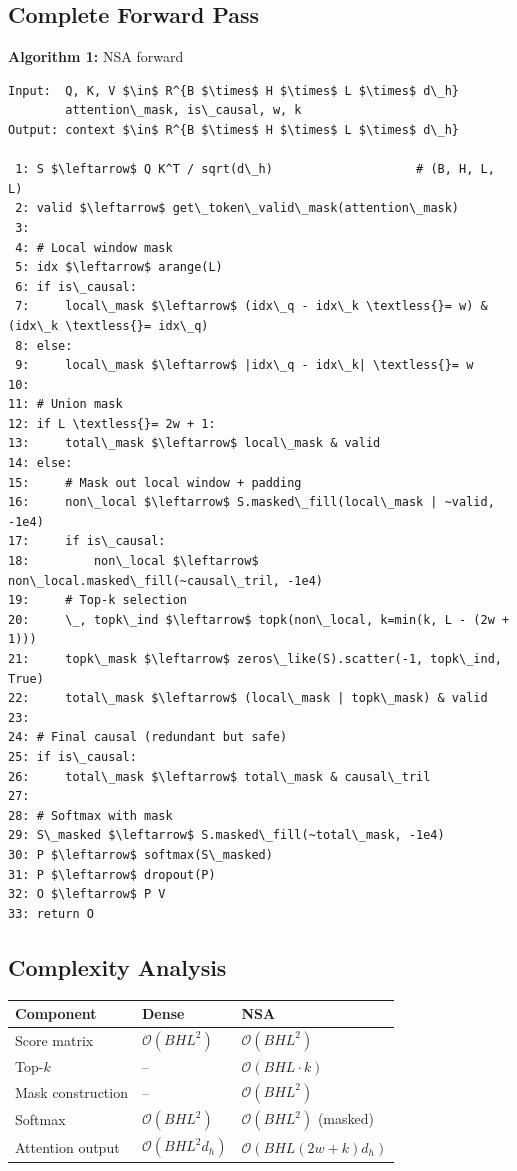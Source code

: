 \subsection{Complete Forward Pass}

\textbf{Algorithm 1:} NSA forward
\begin{lstlisting}
Input:  Q, K, V $\in$ R^{B $\times$ H $\times$ L $\times$ d\_h}
        attention\_mask, is\_causal, w, k
Output: context $\in$ R^{B $\times$ H $\times$ L $\times$ d\_h}

 1: S $\leftarrow$ Q K^T / sqrt(d\_h)                    # (B, H, L, L)
 2: valid $\leftarrow$ get\_token\_valid\_mask(attention\_mask)
 3:
 4: # Local window mask
 5: idx $\leftarrow$ arange(L)
 6: if is\_causal:
 7:     local\_mask $\leftarrow$ (idx\_q - idx\_k \textless{}= w) & (idx\_k \textless{}= idx\_q)
 8: else:
 9:     local\_mask $\leftarrow$ |idx\_q - idx\_k| \textless{}= w
10:
11: # Union mask
12: if L \textless{}= 2w + 1:
13:     total\_mask $\leftarrow$ local\_mask & valid
14: else:
15:     # Mask out local window + padding
16:     non\_local $\leftarrow$ S.masked\_fill(local\_mask | ~valid, -1e4)
17:     if is\_causal:
18:         non\_local $\leftarrow$ non\_local.masked\_fill(~causal\_tril, -1e4)
19:     # Top-k selection
20:     \_, topk\_ind $\leftarrow$ topk(non\_local, k=min(k, L - (2w + 1)))
21:     topk\_mask $\leftarrow$ zeros\_like(S).scatter(-1, topk\_ind, True)
22:     total\_mask $\leftarrow$ (local\_mask | topk\_mask) & valid
23:
24: # Final causal (redundant but safe)
25: if is\_causal:
26:     total\_mask $\leftarrow$ total\_mask & causal\_tril
27:
28: # Softmax with mask
29: S\_masked $\leftarrow$ S.masked\_fill(~total\_mask, -1e4)
30: P $\leftarrow$ softmax(S\_masked)
31: P $\leftarrow$ dropout(P)
32: O $\leftarrow$ P V
33: return O
\end{lstlisting}

\subsection{Complexity Analysis}

\begin{table}[H]
\centering
\small
\begin{tabular}{lll}
\toprule
\textbf{Component} & \textbf{Dense} & \textbf{NSA} \\
\midrule
Score matrix & $\mathcal{O}(B H L^2)$ & $\mathcal{O}(B H L^2)$ \\
Top-$k$ & -- & $\mathcal{O}(B H L \cdot k)$ \\
Mask construction & -- & $\mathcal{O}(B H L^2)$ \\
Softmax & $\mathcal{O}(B H L^2)$ & $\mathcal{O}(B H L^2)$ (masked) \\
Attention output & $\mathcal{O}(B H L^2 d_h)$ & $\mathcal{O}(B H L (2w+k) d_h)$ \\
\bottomrule
\end{tabular}
\end{table}

